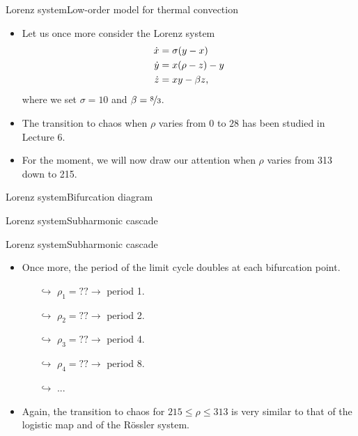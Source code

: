 \documentclass[usenames,dvipsnames,svgnames,10pt,aspectratio=169]{beamer}
\begin{document}
\begin{frame}[t, c]{Lorenz system}{Low-order model for thermal convection}
	\begin{itemize}
		\item Let us once more consider the Lorenz system
		\begin{equation}
			\begin{aligned}
				\dot{x} & = \sigma ( y - x )\\
				\dot{y} & = x(\rho -z) - y \\
				\dot{z} & = xy - \beta z,
			\end{aligned}
			\notag
		\end{equation}
		where we set $\sigma=10$ and $\beta = \nicefrac{8}{3}$.

		\bigskip

		\item The transition to chaos when $\rho$ varies from $0$ to $28$ has been studied in Lecture 6.

		\bigskip

		\item For the moment, we will now draw our attention when $\rho$ varies from 313 down to 215.
	\end{itemize}

	\vspace{1cm}
\end{frame}

\begin{frame}[t, c]{Lorenz system}{Bifurcation diagram}

\end{frame}

\begin{frame}[t, c]{Lorenz system}{Subharmonic cascade}

\end{frame}

\begin{frame}[t, c]{Lorenz system}{Subharmonic cascade}
		\begin{itemize}
			\item Once more, the period of the limit cycle doubles at each bifurcation point.
			\begin{itemize}
				\item[$\hookrightarrow$] $\rho_1 = ?? \to$ period 1.
				\item[$\hookrightarrow$] $\rho_2 = ?? \to$ period 2.
				\item[$\hookrightarrow$] $\rho_3 = ?? \to$ period 4.
				\item[$\hookrightarrow$] $\rho_4 = ?? \to$ period 8.
				\item[$\hookrightarrow$] ...
			\end{itemize}

			\bigskip

			\item Again, the transition to chaos for $215 \leq \rho \leq 313$ is very similar to that of the logistic map and of the R\"ossler system.
		\end{itemize}

		\vspace{1cm}
\end{frame}
\end{document}
